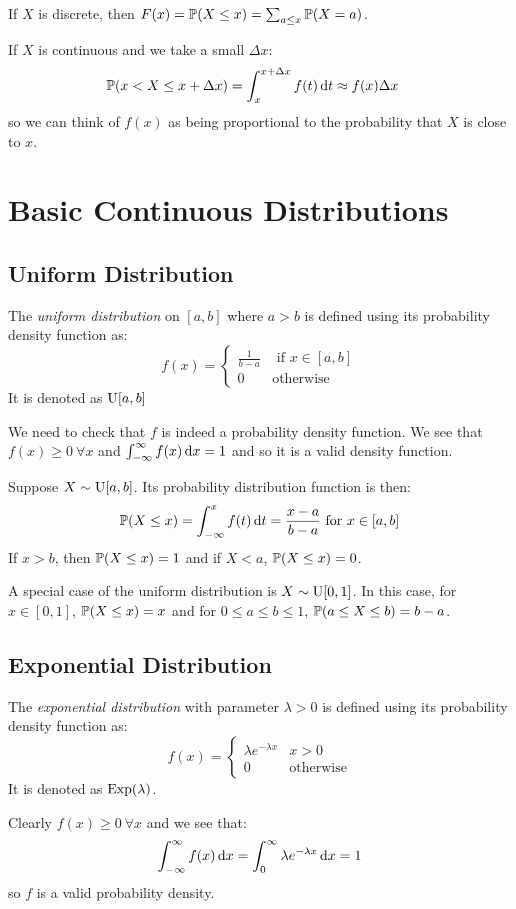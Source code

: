 \documentclass[../main.tex]{subfiles}
\begin{document}
\begin{remark}[Intuition]
  If $X$ is discrete, then $F(x) = \P(X \leq x) = \sum_{a \leq x} \P(X = a)$.

  If $X$ is continuous and we take a small $\Delta x$:
  \begin{align*}
    \P(x < X \leq x + \Delta x) &= \int_{x}^{x + \Delta x} f(t) \d{t} \approx f(x) \Delta x
  \end{align*}
  so we can think of $f(x)$ as being proportional to the probability that $X$ is close to $x$.
\end{remark}
\section{Basic Continuous Distributions}
\subsection{Uniform Distribution}
\label{uniformDist}
\begin{definition}
  The \textit{uniform distribution} on $[a, b]$ where $a > b$ is defined using its probability density function as:
  \[
    f(x) = \begin{cases}
    \frac{1}{b - a} & \text{ if } x \in [a, b] \\
    0 & \text{otherwise}
    \end{cases}
  \]
  It is denoted as $\uniform[a, b]$
\end{definition}
We need to check that $f$ is indeed a probability density function.
We see that $f(x) \geq 0\ \forall x$ and $\int_{-\infty}^{\infty} f(x) \d{x} = 1$ and so it is a valid density function.

Suppose $X \sim \uniform[a, b]$.
Its probability distribution function is then:
\[
  \P(X \leq x) = \int_{-\infty}^{x} f(t) \d{t} = \frac{x - a}{b - a} \text{ for $x \in [a, b]$}
\]
If $x > b$, then $\P(X \leq x) = 1$ and if $X < a$, $\P(X \leq x) = 0$.

A special case of the uniform distribution is $X \sim \uniform[0, 1]$.
In this case, for $x \in [0, 1]$, $\P(X \leq x) = x$ and for $0 \leq a \leq b \leq 1$, $\P(a \leq X \leq b) = b - a$.
\subsection{Exponential Distribution}
\label{exponentialDist}
\begin{definition}
  The \textit{exponential distribution} with parameter $\lambda > 0$ is defined using its probability density function as:
  \[
    f(x) = \begin{cases}
    \lambda e^{-\lambda x} & x > 0 \\
    0 & \text{otherwise}
    \end{cases}
  \]
  It is denoted as $\Exponential(\lambda)$.
\end{definition}
Clearly $f(x) \geq 0\ \forall x$ and we see that:
\[
  \int_{-\infty}^{\infty} f(x) \d{x} = \int_{0}^{\infty} \lambda e^{-\lambda x} \d{x} = 1
\]
so $f$ is a valid probability density.
\end{document}
